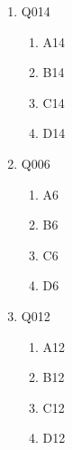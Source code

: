 \documentclass[12pt]{article}
\begin{document}
\begin{enumerate}
\begin{enumerate}[label=(\Alph*)]
        \item A11
        
        \item B11
        
        \item C11
        
        \item D11
        
    \end{enumerate}

    \item Q014
    \begin{enumerate}[label=(\Alph*)]
        
        \item A14
        
        \item B14
        
        \item C14
        
        \item D14
        
    \end{enumerate}

    \item Q006
    \begin{enumerate}[label=(\Alph*)]
        
        \item A6
        
        \item B6
        
        \item C6
        
        \item D6
        
    \end{enumerate}

    \item Q012
    \begin{enumerate}[label=(\Alph*)]
        
        \item A12
        
        \item B12
        
        \item C12
        
        \item D12
        
    \end{enumerate}


\end{enumerate}
\end{document}
